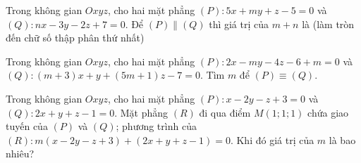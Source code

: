 \begin{ex} %
	Trong không gian $Oxyz$, cho hai mặt phẳng $\left(P\right) \colon 5x+my+z-5=0$ và $\left(Q\right) \colon nx-3y-2z+7=0$. Để $\left(P\right) \parallel \left(Q\right)$ thì giá trị của $m+n$ là (làm tròn đến chữ số thập phân thứ nhất)
\end{ex}

\begin{ex} %
	Trong không gian $Oxyz$, cho hai mặt phẳng $\left(P\right) \colon 2x-my-4z-6+m=0$ và $\left(Q\right) \colon \left(m+3\right)x +y+\left(5m+1\right)z -7=0$. Tìm $m$ để $\left(P\right) \equiv \left(Q\right)$.
\end{ex}

\begin{ex} %
	Trong không gian $Oxyz$, cho hai mặt phẳng $\left(P\right) \colon x-2y-z+3=0$ và $\left(Q\right) \colon 2x +y+z -1=0$. Mặt phẳng $\left(R\right)$ đi qua điểm $M\left(1;1;1\right)$ chứa giao tuyến của $\left(P\right)$ và $\left(Q\right)$; phương trình của $\left(R\right) \colon m\left(x-2y-z+3\right) + \left(2x+y+z-1\right)=0$. Khi đó giá trị của $m$ là bao nhiêu?
\end{ex}

